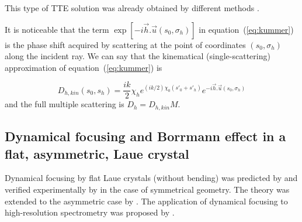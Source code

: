 \documentclass[preprint]{iucr}              %
\newcommand{\inred}[1]{{\color{red}#1}}
\begin{document}
This \inred{type of TTE solution} was already obtained by different methods \cite{Petrashen1974,Katagawa1974,Litzmann1974,Chukhovski1977}.

\inred{
It is noticeable that the term $\exp[-i\vec h . \vec u (s_0,\sigma_h)]$ in equation~(\ref{eq:kummer}) is the phase shift acquired by scattering at the point of coordinates $(s_0,\sigma_h)$ along the incident ray. We can say that the kinematical (single-scattering) approximation of equation~(\ref{eq:kummer}) is 

\begin{equation}
\label{eq:kummerapprox}
    D_{h,kin}(s_0,s_h) = \frac{i k }{2} \chi_h e^{(ik/2) \chi_0 (s'_0 + s'_h)} e^{-i \vec h . \vec u (s_0,\sigma_h)} 
\end{equation}
and the full multiple scattering is $D_h=D_{h,kin} M$.
}

          
\subsection{Dynamical focusing and Borrmann effect in a flat\inred{, asymmetric, Laue} crystal}
\label{sec:LaueFlat}



Dynamical focusing \inred{by} flat Laue crystals (without bending) \inred{was predicted by}  and verified experimentally by \cite{Aristov1978,Aristov1980PhysStatSol,Aristov1980}
in the case of symmetrical geometry. The theory was extended to the asymmetric case by . \inred{The application of dynamical focusing to high-resolution spectrometry was proposed by \citeasnoun{KohnGorobtsov2013}.}
\end{document}
